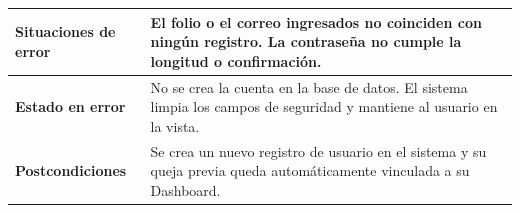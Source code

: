 \begin{longtable}{|p{3.5cm}|p{2cm}|p{2.5cm}|p{7cm}|}
\textbf{Situaciones de error} & \multicolumn{3}{p{11.5cm}|}{El folio o el correo ingresados no coinciden con ningún registro. La contraseña no cumple la longitud o confirmación.} \\ \hline
\textbf{Estado en error} & \multicolumn{3}{p{11.5cm}|}{No se crea la cuenta en la base de datos. El sistema limpia los campos de seguridad y mantiene al usuario en la vista.} \\ \hline
\textbf{Postcondiciones} & \multicolumn{3}{p{11.5cm}|}{Se crea un nuevo registro de usuario en el sistema y su queja previa queda automáticamente vinculada a su Dashboard.} \\ \hline
\end{longtable}
\endgroup

\vspace{0.8cm}

